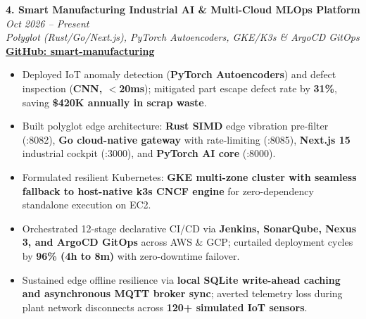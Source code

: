 \documentclass[9.5pt,a4paper]{article}
\begin{document}
\noindent\textbf{4. Smart Manufacturing Industrial AI \& Multi-Cloud MLOps Platform} \hfill {\small\textit{Oct 2026 -- Present}}\\
\textit{Polyglot (Rust/Go/Next.js), PyTorch Autoencoders, GKE/K3s \& ArgoCD GitOps} \hfill {\footnotesize\href{https://github.com/KishorKumarParoi/smart-manufacturing}{\textbf{GitHub: smart-manufacturing}}}
\begin{itemize}
    \item Deployed IoT anomaly detection (\textbf{PyTorch Autoencoders}) and defect inspection (\textbf{CNN, $<$20ms}); mitigated part escape defect rate by \textbf{31\%}, saving \textbf{\$420K annually in scrap waste}.
    \item Built polyglot edge architecture: \textbf{Rust SIMD} edge vibration pre-filter (:8082), \textbf{Go cloud-native gateway} with rate-limiting (:8085), \textbf{Next.js 15} industrial cockpit (:3000), and \textbf{PyTorch AI core} (:8000).
    \item Formulated resilient Kubernetes: \textbf{GKE multi-zone cluster with seamless fallback to host-native k3s CNCF engine} for zero-dependency standalone execution on EC2.
    \item Orchestrated 12-stage declarative CI/CD via \textbf{Jenkins, SonarQube, Nexus 3, and ArgoCD GitOps} across AWS \& GCP; curtailed deployment cycles by \textbf{96\% (4h to 8m)} with zero-downtime failover.
    \item Sustained edge offline resilience via \textbf{local SQLite write-ahead caching and asynchronous MQTT broker sync}; averted telemetry loss during plant network disconnects across \textbf{120+ simulated IoT sensors}.
\end{itemize}
\end{document}
